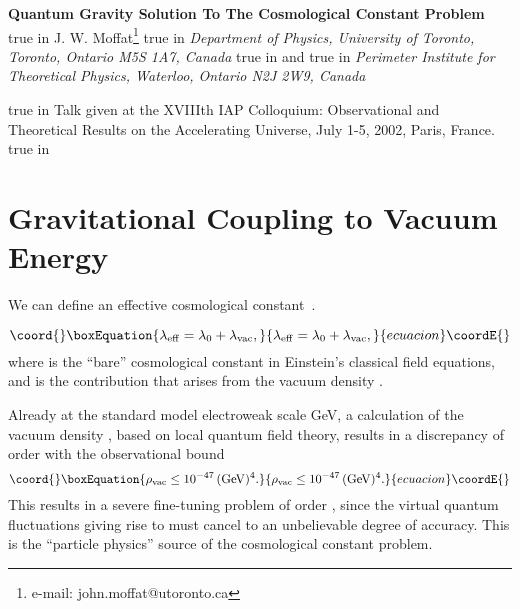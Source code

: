 \documentclass[a4paper,11pt]{article}
\begin{document}
\pagestyle{plain}
\setcounter{page}{1}
\begin{center}
{\large\bf Quantum Gravity Solution To The Cosmological Constant
Problem}
 true in {\large J. W. Moffat}\footnote{e-mail:
john.moffat@utoronto.ca}   true in {\it Department of
Physics, University of Toronto, Toronto, Ontario M5S 1A7,
Canada}  true in and  true in {\it Perimeter
Institute for Theoretical Physics, Waterloo, Ontario N2J 2W9,
Canada}
\date{\today}
\begin{abstract}%
A nonlocal quantum gravity theory is presented which is finite and unitary
to all orders of perturbation theory. Vertex form factors in Feynman
diagrams involving gravitons suppress graviton and matter vacuum
fluctuation loops by introducing a low-energy gravitational scale,
\coordHE{} eV. Gravitons coupled to
non-vacuum matter loops and matter tree graphs are controlled by a vertex
form factor with the energy scale, \coordHE{} TeV.
\end{abstract}

\end{center}
 true in
Talk given at the XVIIIth IAP Colloquium: Observational and
Theoretical Results on the Accelerating Universe, July 1-5, 2002,
Paris, France.
 true in

\section{\bf Gravitational Coupling to Vacuum Energy}

We can define an effective cosmological constant~\cite{Straumann}.

\begin{equation}\coord{}\boxEquation{
\lambda_{\rm eff}=\lambda_0+\lambda_{\rm vac},
}{
\lambda_{\rm eff}=\lambda_0+\lambda_{\rm vac},
}{ecuacion}\coordE{}\end{equation}
where \coordHE{} is the ``bare'' cosmological
constant in Einstein's classical field equations,
and \coordHE{} is the contribution that arises from the
vacuum density \coordHE{}.

Already at the standard model electroweak scale \coordHE{} GeV, a
calculation of the vacuum density \coordHE{}, based on local quantum field
theory, results in a discrepancy of order \coordHE{} with the observational
bound
\begin{equation}\coord{}\boxEquation{
\label{vacbound}
\rho_{\rm vac} \leq 10^{-47}\, ({\rm GeV})^4.
}{
\rho_{\rm vac} \leq 10^{-47}\, ({\rm GeV})^4.
}{ecuacion}\coordE{}\end{equation}
This results in a severe fine-tuning problem of order \coordHE{},
since the virtual quantum fluctuations giving rise to \coordHE{}
must cancel \coordHE{} to an unbelievable degree of accuracy.
This is the ``particle physics'' source of the cosmological
constant problem.
\end{document}
